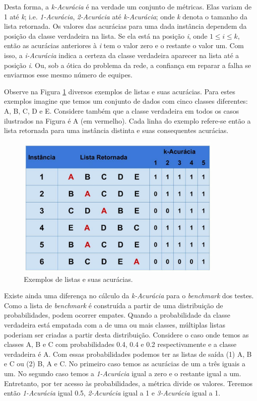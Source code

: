 {Desta forma, a \textit{k-Acurácia} é na verdade um conjunto de métricas.
Elas variam de 1 até \textit{k}; i.e. \textit{1-Acurácia}, \textit{2-Acurácia} até \textit{k-Acurácia}; onde \textit{k} denota o tamanho da lista retornada.
Os valores das acurácias para uma dada instância dependem da posição da classe verdadeira na lista.
Se ela está na posição \textit{i}, onde $1 \leq \textit{i} \leq \textit{k}$, então as acurácias anteriores à \textit{i} tem o valor zero e o restante o valor um.
Com isso, a \textit{i-Acurácia} indica a certeza da classe verdadeira aparecer na lista até a posição \textit{i}.
Ou, sob a ótica do problema da rede, a confiança em reparar a falha se enviarmos esse mesmo número de equipes.

Observe na Figura \ref{fig:descricaodostestes01} diversos exemplos de listas e suas acurácias.
Para estes exemplos imagine que temos um conjunto de dados com cinco classes diferentes: A, B, C, D e E.
Considere também que a classe verdadeira em todos os casos ilustrados na Figura é A (em vermelho).
Cada linha do exemplo refere-se então a lista retornada para uma instância distinta e suas consequentes acurácias.

\begin{figure}[h!]
  \centering
  \includegraphics[width=100mm,scale=0.7]{images/descricaodostestes01.eps}
  \caption{Exemplos de listas e suas acurácias.}
  \label{fig:descricaodostestes01}
\end{figure}

Existe ainda uma diferença no cálculo da \textit{k-Acurácia} para o \textit{benchmark} dos testes.
Como a lista de \textit{benchmark} é construída a partir de uma distribuição de probabilidades, podem ocorrer empates.
Quando a probabilidade da classe verdadeira está empatada com a de uma ou mais classes, múltiplas listas poderiam ser criadas a partir desta distribuição.
Considere o caso onde temos as classes A, B e C com probabilidades 0.4, 0.4 e 0.2 respectivamente e a classe verdadeira é A.
Com essas probabilidades podemos ter as listas de saída (1) A, B e C ou (2) B, A e C.
No primeiro caso temos as acurácias de um a três iguais a um.
No segundo caso temos a \textit{1-Acurácia} igual a zero e o restante igual a um.
Entretanto, por ter acesso às probabilidades, a métrica divide os valores.
Teremos então \textit{1-Acurácia} igual 0.5, \textit{2-Acurácia} igual a 1 e \textit{3-Acurácia} igual a 1.

}
